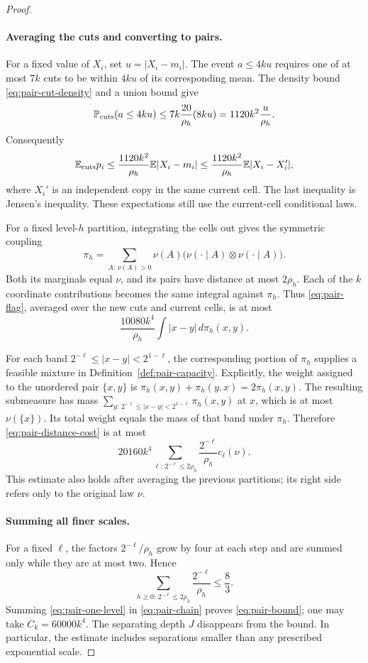 \begin{proof}
\paragraph{Averaging the cuts and converting to pairs.}
For a fixed value of $X_i$, set $u=|X_i-m_i|$.
The event $a\le4ku$ requires one of at most $7k$ cuts to be within
$4ku$ of its corresponding mean.  The density bound
\eqref{eq:pair-cut-density} and a union bound give
\[
 \P_{\rm cuts}(a\le4ku)
 \le7k\frac{20}{\rho_h}(8ku)
 =1120k^2\frac{u}{\rho_h}.
\]
Consequently
\[
 \E_{\rm cuts}p_i
 \le\frac{1120k^2}{\rho_h}\E|X_i-m_i|
 \le\frac{1120k^2}{\rho_h}\E|X_i-X_i'|,
\]
where $X_i'$ is an independent copy in the same current cell.
The last inequality is Jensen's inequality.  These expectations
still use the current-cell conditional laws.

For a fixed level-$h$ partition, integrating the cells out gives
the symmetric coupling
\[
 \pi_h=\sum_{A:\,\nu(A)>0}\nu(A)
 \bigl(\nu(\cdot\mid A)\otimes\nu(\cdot\mid A)\bigr).
\]
Both its marginals equal $\nu$, and its pairs have distance at most
$2\rho_h$.  Each of the $k$ coordinate contributions becomes the
same integral against $\pi_h$.  Thus \eqref{eq:pair-flag}, averaged
over the new cuts and current cells, is at most
\begin{equation}\label{eq:pair-distance-cost}
 \frac{10080k^4}{\rho_h}\int|x-y|\,d\pi_h(x,y).
\end{equation}

For each band $2^{-\ell}\le|x-y|<2^{1-\ell}$, the corresponding
portion of $\pi_h$ supplies a feasible mixture in
Definition~\ref{def:pair-capacity}.  Explicitly, the weight assigned
to the unordered pair $\{x,y\}$ is
$\pi_h(x,y)+\pi_h(y,x)=2\pi_h(x,y)$.
The resulting submeasure has mass
$\sum_{y:\,2^{-\ell}\le|x-y|<2^{1-\ell}}\pi_h(x,y)$ at $x$,
which is at most $\nu(\{x\})$.  Its total weight equals the mass of
that band under $\pi_h$.  Therefore \eqref{eq:pair-distance-cost}
is at most
\begin{equation}\label{eq:pair-one-level}
 20160k^4
 \sum_{\ell:\,2^{-\ell}\le2\rho_h}
 \frac{2^{-\ell}}{\rho_h}c_\ell(\nu).
\end{equation}
This estimate also holds after averaging the previous partitions;
its right side refers only to the original law $\nu$.

\paragraph{Summing all finer scales.}
For a fixed $\ell$, the factors $2^{-\ell}/\rho_h$ grow by four
at each step and are summed only while they are at most two.
Hence
\[
 \sum_{h\ge0:\,2^{-\ell}\le2\rho_h}
       \frac{2^{-\ell}}{\rho_h}\le\frac83.
\]
Summing \eqref{eq:pair-one-level} in \eqref{eq:pair-chain} proves
\eqref{eq:pair-bound}; one may take $C_k=60000k^4$.
The separating depth $J$ disappears from the bound.  In particular,
the estimate includes separations smaller than any prescribed
exponential scale.
\end{proof}

